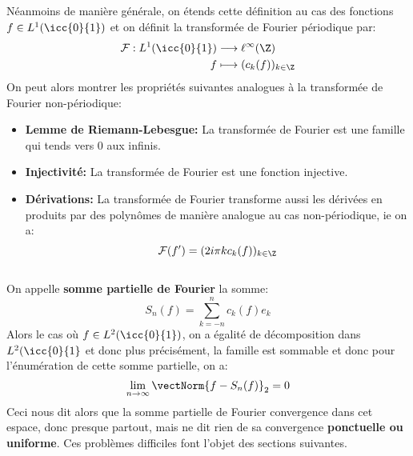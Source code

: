 \subsection*{}
Néanmoins de manière générale, on étends cette définition au cas des fonctions \( f \in L^1( \icc{0}{1}) \) et on définit la transformée de Fourier périodique par:
\[
   \begin{aligned}
      \mathcal{F}: L^1( \icc{0}{1}) &\longrightarrow \ell^\infty(\Z)\\
      f &\longmapsto (c_k(f))_{k \in \Z}
   \end{aligned}
\]
On peut alors montrer les propriétés suivantes analogues à la transformée de Fourier non-périodique:
\begin{itemize}
   \item \textbf{Lemme de Riemann-Lebesgue:} La transformée de Fourier est une famille qui tends vers \( 0 \) aux infinis.
   \item \textbf{Injectivité:} La transformée de Fourier est une fonction injective.
   \item \textbf{Dérivations:} La transformée de Fourier transforme aussi les dérivées en produits par des polynômes de manière analogue au cas non-périodique, ie on a:
   \[ 
      \mathcal{F}(f') = (2i\pi k c_k(f))_{k \in \Z}
   \]
\end{itemize} 
\subsection*{}
On appelle \textbf{somme partielle de Fourier} la somme:
\[ 
   S_n(f) = \sum_{k = -n}^n c_k(f)e_k 
\] 
Alors le cas où \( f \in L^2(\icc{0}{1}) \), on a égalité de décomposition dans \( L^2(\icc{0}{1} \) et donc plus précisément, la famille est sommable et donc pour l'énumération de cette somme partielle, on a:
\[ 
   \lim_{n \rightarrow \infty}\vectNorm{f - S_n(f)}_2 = 0
\]
Ceci nous dit alors que la somme partielle de Fourier convergence dans cet espace, donc presque partout, mais ne dit rien de sa convergence \textbf{ponctuelle ou uniforme}. Ces problèmes difficiles font l'objet des sections suivantes.

